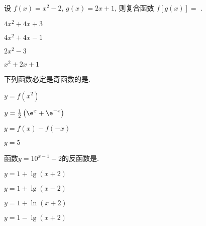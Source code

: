 				\begin{problem}
					设
					$f\left( x \right) = x^{2} - 2$, $g\left( x \right) = 2x + 1$, 则复合函数
					$f\left\lbrack g\left( x \right) \right\rbrack =$ .
					
					
					\begin{abcd} \item $4x^{2} + 4x + 3$
						
						\item $4x^{2} + 4x - 1$
						
						\item $2x^{2} - 3$
						
						\item $x^{2} + 2x + 1$
					\end{abcd}
				\end{problem}
				
				\begin{problem}
					下列函数必定是奇函数的是\pickin{C}.
					
					
					\begin{abcd} \item $y = f\left( x^{2} \right)$
						
						\item $y = \frac{1}{2}\left( \e^{x} + \e^{- x} \right)$
						
						\item $y = f\left( x \right) - f\left( - x \right)$
						
						\item $y = 5$
						
				\end{abcd}  \end{problem}
				
				\begin{problem}
					函数$y = 10^{x - 1} - 2$的反函数是\pickin{A}.
					
					
					\begin{abcd} \item $y = 1 + \lg\left( x + 2 \right)$
						
						\item $y = 1 + \lg\left( x - 2 \right)$
						
						\item $y = 1 + \ln\left( x + 2 \right)$
						
						\item $y = 1 - \lg\left( x + 2 \right)$
						
				\end{abcd}  \end{problem}
				
